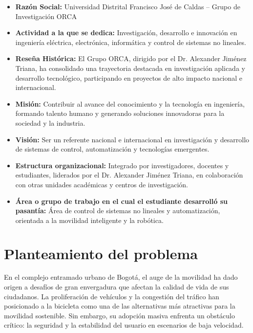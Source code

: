 \documentclass[12pt,letterpaper]{report}
\begin{document}
\begin{itemize}
    \setlength\itemsep{6pt}
    \item \textbf{Razón Social:} Universidad Distrital Francisco José de Caldas – Grupo de Investigación ORCA
    \item \textbf{Actividad a la que se dedica:} Investigación, desarrollo e innovación en ingeniería eléctrica, electrónica, informática y control de sistemas no lineales.
    \item \textbf{Reseña Histórica:} El Grupo ORCA, dirigido por el Dr. Alexander Jiménez Triana, ha consolidado una trayectoria destacada en investigación aplicada y desarrollo tecnológico, participando en proyectos de alto impacto nacional e internacional.
    \item \textbf{Misión:} Contribuir al avance del conocimiento y la tecnología en ingeniería, formando talento humano y generando soluciones innovadoras para la sociedad y la industria.
    \item \textbf{Visión:} Ser un referente nacional e internacional en investigación y desarrollo de sistemas de control, automatización y tecnologías emergentes.
    \item \textbf{Estructura organizacional:} Integrado por investigadores, docentes y estudiantes, liderados por el Dr. Alexander Jiménez Triana, en colaboración con otras unidades académicas y centros de investigación.
    \item \textbf{Área o grupo de trabajo en el cual el estudiante desarrolló su pasantía:} Área de control de sistemas no lineales y automatización, orientada a la movilidad inteligente y la robótica.
\end{itemize}

\chapter{Planteamiento del problema}

En el complejo entramado urbano de Bogotá, el auge de la movilidad ha dado origen a desafíos de gran envergadura que afectan la calidad de vida de sus ciudadanos. La proliferación de vehículos y la congestión del tráfico han posicionado a la bicicleta como una de las alternativas más atractivas para la movilidad sostenible. Sin embargo, su adopción masiva enfrenta un obstáculo crítico: la seguridad y la estabilidad del usuario en escenarios de baja velocidad.
\end{document}
